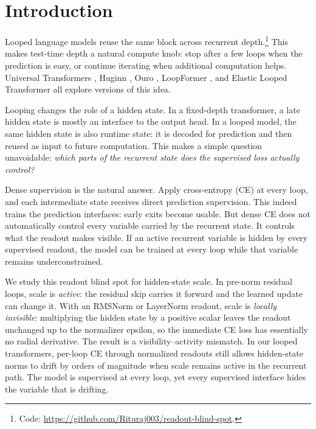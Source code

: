 \section{Introduction}
\label{sec:intro}

Looped language models reuse the same block across recurrent depth.\footnote{Code: \url{https://github.com/Rituraj003/readout-blind-spot}.}
This makes test-time depth a natural compute knob: stop after a few loops when the prediction is easy, or continue iterating when additional computation helps.
Universal Transformers \citep{dehghani2019universal}, Huginn \citep{geiping2025huginn}, Ouro \citep{zhu2025ouro}, LoopFormer \citep{jeddi2026loopformer}, and Elastic Looped Transformer \citep{goyal2026elt} all explore versions of this idea.

Looping changes the role of a hidden state.
In a fixed-depth transformer, a late hidden state is mostly an interface to the output head.
In a looped model, the same hidden state is also runtime state: it is decoded for prediction and then reused as input to future computation.
This makes a simple question unavoidable:
\emph{which parts of the recurrent state does the supervised loss actually control?}

Dense supervision is the natural answer.
Apply cross-entropy (CE) at every loop, and each intermediate state receives direct prediction supervision.
This indeed trains the prediction interfaces: early exits become usable.
But dense CE does not automatically control every variable carried by the recurrent state.
It controls what the readout makes visible.
If an active recurrent variable is hidden by every supervised readout, the model can be trained at every loop while that variable remains underconstrained.

We study this readout blind spot for hidden-state scale.
In pre-norm residual loops, scale is \emph{active}: the residual skip carries it forward and the learned update can change it.
With an RMSNorm or LayerNorm readout, scale is \emph{locally invisible}: multiplying the hidden state by a positive scalar leaves the readout unchanged up to the normalizer epsilon, so the immediate CE loss has essentially no radial derivative.
The result is a visibility--activity mismatch.
In our looped transformers, per-loop CE through normalized readouts still allows hidden-state norms to drift by orders of magnitude when scale remains active in the recurrent path.
The model is supervised at every loop, yet every supervised interface hides the variable that is drifting.

